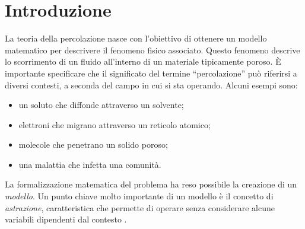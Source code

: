 \section{Introduzione}

La teoria della percolazione nasce con l'obiettivo di ottenere un modello matematico 
per descrivere il fenomeno fisico associato. Questo fenomeno descrive lo scorrimento 
di un fluido all'interno di un materiale tipicamente poroso. È importante specificare 
che il significato del termine ``percolazione'' può riferirsi a diversi contesti, 
a seconda del campo in cui si sta operando. Alcuni esempi sono: 
\begin{itemize}
    \item un soluto che diffonde attraverso un solvente;
    \item elettroni che migrano attraverso un reticolo atomico;
    \item molecole che penetrano un solido poroso;
    \item una malattia che infetta una comunità.
\end{itemize}
La formalizzazione matematica del problema ha reso possibile la creazione 
di un \textit{modello}. Un punto chiave molto importante di un modello 
è il concetto di \textit{astrazione}, caratteristica che permette di
operare senza considerare alcune variabili dipendenti dal contesto \cite{broadbent}.